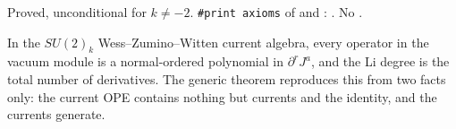 \begin{status}
Proved, unconditional for $k\neq-2$. \texttt{\#print axioms} of
\allowbreak{}\allowbreak{}\allowbreak{} and
\allowbreak{}\allowbreak{}\allowbreak{}\allowbreak{}\allowbreak{}\allowbreak{}:
\lean{[propext, Classical.}\allowbreak{}\allowbreak\lean{sound]}. No .
\end{status}

\begin{physics}
In the $SU(2)_k$ Wess--Zumino--Witten current algebra, every operator in the vacuum module is a normal-ordered polynomial
in $\partial^rJ^a$, and the Li degree is the total number of derivatives. The generic theorem reproduces this from two
facts only: the current OPE contains nothing but currents and the identity, and the currents generate.
\end{physics}

